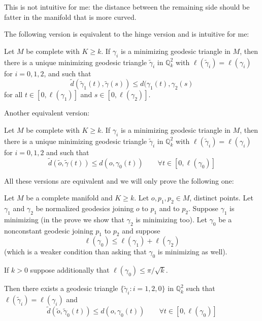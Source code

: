 \documentclass{book}
\begin{document}
This is not intuitive for me: the distance
between the remaining side should be
fatter in the manifold that is more curved.

The following version is equivalent to the
hinge version and is intuitive for
me:

\begin{theorem}[Toponogov]
\label{theorem-Toponogov-hinge2}
Let $M$ be complete with $K\geq k$. If
$\gamma_i$ is a minimizing geodesic
triangle in $M$, then there is a unique
minimizing geodesic triangle
$\tilde{\gamma}_i$ in $\mathbb{Q}_k^2$ with
$\ell(\tilde{\gamma}_i)=\ell(\gamma_i)$ for
$i=0,1,2$, and such that
\begin{equation}
\label{equation-Toponogov-hinge2}
\tilde{d}(\tilde{\gamma}_1(t),\tilde{\gamma}
(s))\leq
d(\gamma_1(t),\gamma_2(s)
\end{equation}
for all $t\in[0,\ell(\gamma_1)]$ and
$s\in[0,\ell(\gamma_2)]$.
\end{theorem}

Another equivalent version:
\begin{theorem}[Toponogov]
\label{theorem-Toponogov-hinge3}
Let $M$ be complete with $K\geq k$. If
$\gamma_i$ is a minimizing geodesic
triangle in $M$, then there is a unique
minimizing geodesic triangle
$\tilde{\gamma}_i$ in $\mathbb{Q}_k^2$ with
$\ell(\tilde{\gamma}_i)=\ell(\gamma_i)$ for
$i=0,1,2$ and such that
\begin{equation}
\label{equation-Toponogov-hinge3}
\tilde{d}(\tilde{o},\tilde{\gamma}(t))\leq
d(o,\gamma_0(t))
\qquad \forall t\in[0,\ell(\gamma_0)]
\end{equation}
\end{theorem}
All these versions are equivalent and we will
only prove the following one:
\begin{theorem}
\label{theorem-Toponogov-metric}
Let $M$ be a complete manifold and $K \geq
k$. Let $o,p_1,p_2 \in M$, distinct
points. Let $\gamma_1$ and $\gamma_2$ be
normalized geodesics joining
$o$ to $p_1$ and to $p_2$. Suppose $\gamma_1$
is minimizing (in the prove we
show that $\gamma_2$ is minimizing too).
Let $\gamma_0$ be a nonconstant geodesic
joining $p_1$ to $p_2$ and suppose
$$
\ell(\gamma_0) \leq \ell(\gamma_1)
+\ell(\gamma_2)
$$
(which is a weaker condition than asking that
$\gamma_0$ is minimizing as well).

If $k>0$ suppose additionally that
$\ell(\gamma_0) \leq \pi/\sqrt{k}$.

Then there exists a geodesic triangle
$\{\tilde{\gamma}_i:i=1,2,0\}$ in
$\mathbb{Q}_k^2$ such that
$\ell(\tilde{\gamma}_i) = \ell(\gamma_i)$ and
\begin{equation}
\label{equation-Toponogov-metric}
\tilde{d}(\tilde{o},\tilde{\gamma}_0(t))
\leq  d(o,\gamma_0(t))
\qquad \forall t \in[0,\ell(\gamma_0)]
\end{equation}
\end{theorem}
\end{document}
